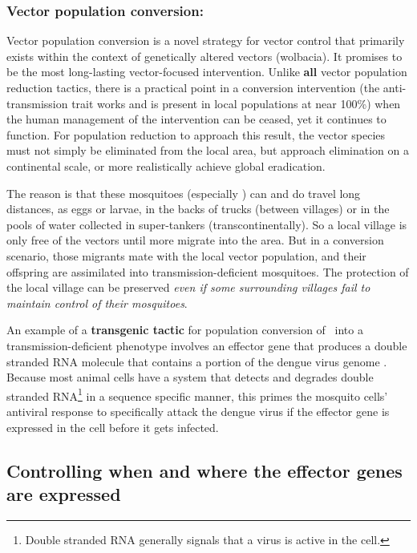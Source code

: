 \subsubsection{Vector population conversion:}

Vector population conversion is a novel strategy for vector control that primarily exists within the context of genetically altered vectors (\CITEME wolbacia).
It promises to be the most long-lasting vector-focused intervention.
Unlike \textbf{all} vector population reduction tactics, there is a practical point in a conversion intervention (the anti-transmission trait works and is present in local populations at near 100\%) when the human management of the intervention can be ceased, yet it continues to function.
For population reduction to approach this result, the vector species must not simply be eliminated from the local area, but approach elimination on a continental scale, or more realistically achieve global eradication.

The reason is that these mosquitoes (especially \Aa) can and do travel long distances, as eggs or larvae, in the backs of trucks (between villages) or in the pools of water collected in super-tankers (transcontinentally).
So a local village is only free of the vectors until more migrate into the area.
But in a conversion scenario, those migrants mate with the local vector population, and their offspring are assimilated into transmission-deficient mosquitoes.
The protection of the local village can be preserved \emph{even if some surrounding villages fail to maintain control of their mosquitoes}.

An example of a \textbf{transgenic tactic} for population conversion of \Aa\ into a transmission-deficient phenotype involves an effector gene that produces a double stranded RNA molecule that contains a portion of the dengue virus genome \cite{Franz2006,Mathur2010}.
Because most animal cells have a system that detects and degrades double stranded RNA\footnote{Double stranded RNA generally signals that a virus is active in the cell.}
in a sequence specific manner, this primes the mosquito cells' antiviral response to specifically attack the dengue virus if the effector gene is expressed in the cell before it gets infected.

\subsection{Controlling when and where the effector genes are expressed}

